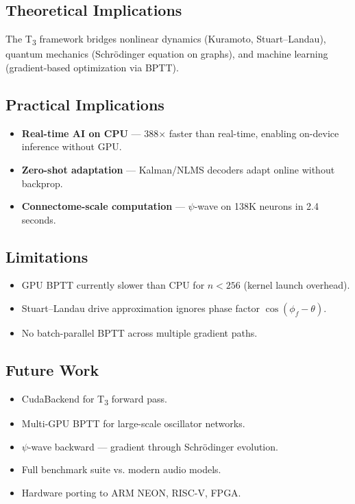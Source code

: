 \documentclass[twocolumn,10pt]{article}
\newcommand{\Tthree}{T\textsubscript{3}}
\newcommand{\psiwave}{$\psi$-wave}
\begin{document}
\subsection{Theoretical Implications}

The \Tthree{} framework bridges nonlinear dynamics (Kuramoto, Stuart--Landau), quantum mechanics (Schr\"odinger equation on graphs), and machine learning (gradient-based optimization via BPTT).

\subsection{Practical Implications}

\begin{itemize}
  \item \textbf{Real-time AI on CPU} --- 388$\times$ faster than real-time, enabling on-device inference without GPU.
  \item \textbf{Zero-shot adaptation} --- Kalman/NLMS decoders adapt online without backprop.
  \item \textbf{Connectome-scale computation} --- \psiwave{} on 138K neurons in 2.4 seconds.
\end{itemize}

\subsection{Limitations}

\begin{itemize}
  \item GPU BPTT currently slower than CPU for $n < 256$ (kernel launch overhead).
  \item Stuart--Landau drive approximation ignores phase factor $\cos(\phi_f - \theta)$.
  \item No batch-parallel BPTT across multiple gradient paths.
\end{itemize}

\subsection{Future Work}

\begin{itemize}
  \item CudaBackend for \Tthree{} forward pass.
  \item Multi-GPU BPTT for large-scale oscillator networks.
  \item \psiwave{} backward --- gradient through Schr\"odinger evolution.
  \item Full benchmark suite vs. modern audio models.
  \item Hardware porting to ARM NEON, RISC-V, FPGA.
\end{itemize}
\end{document}
